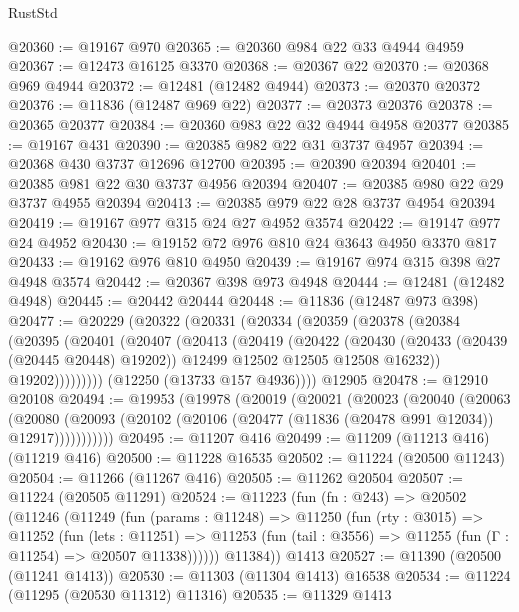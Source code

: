 \begin{lexlean}{RustStd}
\begin{coremodule}
@20360 := @19167 @970
@20365 := @20360 @984 @22 @33 @4944 @4959
@20367 := @12473 @16125 @3370
@20368 := @20367 @22
@20370 := @20368 @969 @4944
@20372 := @12481 (@12482 @4944)
@20373 := @20370 @20372
@20376 := @11836 (@12487 @969 @22)
@20377 := @20373 @20376
@20378 := @20365 @20377
@20384 := @20360 @983 @22 @32 @4944 @4958 @20377
@20385 := @19167 @431
@20390 := @20385 @982 @22 @31 @3737 @4957
@20394 := @20368 @430 @3737 @12696 @12700
@20395 := @20390 @20394
@20401 := @20385 @981 @22 @30 @3737 @4956 @20394
@20407 := @20385 @980 @22 @29 @3737 @4955 @20394
@20413 := @20385 @979 @22 @28 @3737 @4954 @20394
@20419 := @19167 @977 @315 @24 @27 @4952 @3574
@20422 := @19147 @977 @24 @4952
@20430 := @19152 @72 @976 @810 @24 @3643 @4950 @3370 @817
@20433 := @19162 @976 @810 @4950
@20439 := @19167 @974 @315 @398 @27 @4948 @3574
@20442 := @20367 @398 @973 @4948
@20444 := @12481 (@12482 @4948)
@20445 := @20442 @20444
@20448 := @11836 (@12487 @973 @398)
@20477 := @20229
    (@20322
      (@20331
        (@20334
          (@20359
            (@20378
              (@20384
                (@20395
                  (@20401
                    (@20407
                      (@20413
                        (@20419
                          (@20422
                            (@20430
                              (@20433 (@20439 (@20445 @20448) @19202))
                              @12499
                              @12502
                              @12505
                              @12508
                              @16232))
                          @19202)))))))))
        (@12250 (@13733 @157 @4936))))
    @12905
@20478 := @12910 @20108
@20494 := @19953
    (@19978
      (@20019
        (@20021
          (@20023
            (@20040
              (@20063
                (@20080
                  (@20093 (@20102 (@20106 (@20477 (@11836 (@20478 @991 @12034)) @12917)))))))))))
@20495 := @11207 @416
@20499 := @11209 (@11213 @416) (@11219 @416)
@20500 := @11228 @16535
@20502 := @11224 (@20500 @11243)
@20504 := @11266 (@11267 @416)
@20505 := @11262 @20504
@20507 := @11224 (@20505 @11291)
@20524 := @11223
    (fun (fn : @243) =>
    @20502
      (@11246
        (@11249
          (fun (params : @11248) =>
          @11250
            (fun (rty : @3015) =>
            @11252
              (fun (lets : @11251) =>
              @11253 (fun (tail : @3556) => @11255 (fun (Γ : @11254) => @20507 @11338))))))
        @11384))
    @1413
@20527 := @11390 (@20500 (@11241 @1413))
@20530 := @11303 (@11304 @1413) @16538
@20534 := @11224 (@11295 (@20530 @11312) @11316)
@20535 := @11329 @1413

\end{coremodule}
\end{lexlean}
